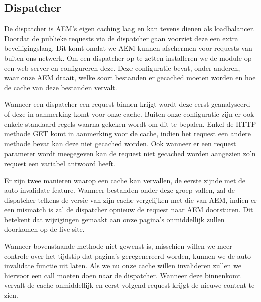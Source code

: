 \documentclass{article}
\begin{document}
	\subsection{Dispatcher}
	De dispatcher is AEM's eigen caching laag en kan tevens dienen als loadbalancer. Doordat de publieke requests via de dispatcher gaan voorziet deze een extra beveiligingslaag. Dit komt omdat we AEM kunnen afschermen voor requests van buiten ons netwerk. Om een dispatcher op te zetten installeren we de module op een web server en configureren deze. Deze configuratie bevat, onder anderen, waar onze AEM draait, welke soort bestanden er gecached moeten worden en hoe de cache van deze bestanden vervalt.
	\par	
	 Wanneer een dispatcher een request binnen krijgt wordt deze eerst geanalyseerd of deze in aanmerking komt voor onze cache. Buiten onze configuratie zijn er ook enkele standaard regels waarna gekeken wordt om dit te bepalen. Enkel de HTTP methode GET komt in aanmerking voor de cache, indien het request een andere methode bevat kan deze niet gecached worden. Ook wanneer er een request parameter wordt meegegeven kan de request niet gecached worden aangezien zo'n request een variabel antwoord heeft.
	\par
	Er zijn twee manieren waarop een cache kan vervallen, de eerste zijnde met de auto-invalidate feature. Wanneer bestanden onder deze groep vallen, zal de dispatcher telkens de versie van zijn cache vergelijken met die van AEM, indien er een mismatch is zal de dispatcher opnieuw de request naar AEM doorsturen. Dit betekent dat wijzigingen gemaakt aan onze pagina's onmiddellijk zullen doorkomen op de live site.
	\par
	Wanneer bovenstaande methode niet gewenst is, misschien willen we meer controle over het tijdstip dat pagina's geregenereerd worden, kunnen we de auto-invalidate functie uit laten. Als we nu onze cache willen invalideren zullen we hiervoor een call moeten doen naar de dispatcher. Wanneer deze binnenkomt vervalt de cache onmiddellijk en eerst volgend request krijgt de nieuwe content te zien.
	\par
\end{document}
